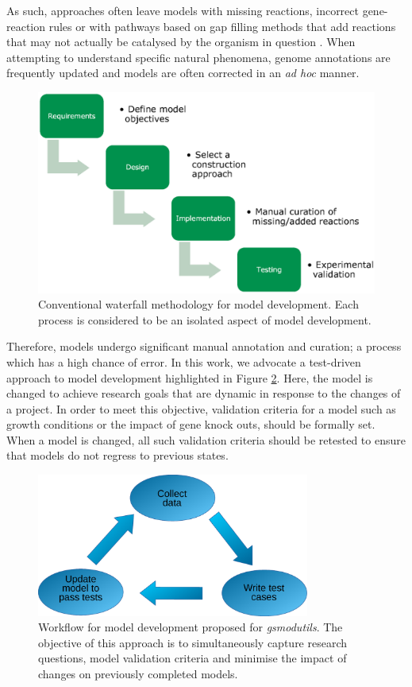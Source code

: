 \documentclass[journal=asbcd6,10pt]{achemso}
\begin{document}
As such, approaches often leave models with missing reactions, incorrect gene-reaction rules \cite{thiele2010protocol} or with pathways based on gap filling methods that add reactions that may not actually be catalysed by the organism in question \cite{benedict2014likelihood}.
When attempting to understand specific natural phenomena, genome annotations are frequently updated and models are often corrected in an \textit{ad hoc} manner.

\begin{figure}[ht]
\includegraphics[width=\textwidth]{waterfall.eps}
\caption{Conventional waterfall methodology for model development.
Each process is considered to be an isolated aspect of model development.}
\label{fig:methodology_approaches}
\end{figure}

Therefore, models undergo significant manual annotation and curation; a process which has a high chance of error.
In this work, we advocate a test-driven approach to model development highlighted in Figure \ref{fig:test_driven}.
Here, the model is changed to achieve research goals that are dynamic in response to the changes of a project.
In order to meet this objective, validation criteria for a model such as growth conditions or the impact of gene knock outs, should be formally set.
When a model is changed, all such validation criteria should be retested to ensure that models do not regress to previous states.

\begin{figure}[ht]
\centering
\includegraphics[width=0.8\textwidth]{testdriven.eps}
\caption{Workflow for model development proposed for \textit{gsmodutils}.
The objective of this approach is to simultaneously capture research questions, model validation criteria and minimise the impact of changes on previously completed models.
}
\label{fig:test_driven}
\end{figure}
\end{document}
